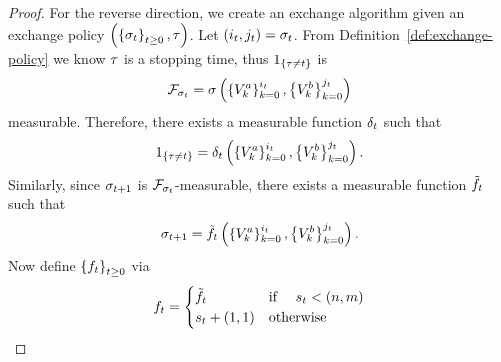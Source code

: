 \begin{proof}
    For the reverse direction, we create an exchange algorithm given an
    exchange policy 
    \(
        \left(
            \left\{
                \sigma_{t}
            \right\}_{t\geq 0},
            \tau 
        \right)
    \).
    Let 
    \(
        \left(
            i_{t},
            j_{t}
        \right)
        =
        \sigma_{t}
    \).
    From Definition~\ref{def:exchange-policy} we know $\tau$ is a stopping time,
    thus
    \(
        1_{
            \left\{
                \tau\neq t
            \right\}
        }
    \)
    is
    \[
        \mathcal{F}_{\sigma_{t}}
        =
        \sigma\left(
            \left\{
                V^a_{k}
            \right\}_{k=0}^{i_{t}}
            ,
            \left\{
                V^b_{k}
            \right\}_{k=0}^{j_{t}}
        \right)
    \]measurable.
    Therefore,
    there exists a measurable function $\delta_{t}$ such that 
    \[
        1_{
            \left\{
                \tau\neq t
            \right\}
        }
        =
        \delta_{t}\left(
            \left\{
                V^a_{k}
            \right\}_{k=0}^{i_{t}}
            ,
            \left\{
                V^b_{k}
            \right\}_{k=0}^{j_{t}}
        \right).
    \]
    Similarly, since $\sigma_{t+1}$ is 
    \(
        \mathcal{F}_{\sigma_{t}}
    \)-measurable,
    there exists a measurable function 
    \(
        \tilde{f_{t}}
    \)
    such that
    \[
        \sigma_{t+1}
        =
        \tilde{f_{t}}
        \left(
            \left\{
                V^a_{k}
            \right\}_{k=0}^{i_{t}}
            ,
            \left\{
                V^b_{k}
            \right\}_{k=0}^{j_{t}}
        \right) .
    \]
    Now define 
    \(
        \left\{
            f_{t}
        \right\}_{t\geq 0}
    \) 
    via
    \[
        f_{t}
        =
        \begin{cases}
            \tilde{f_{t}}
            &
            \text{if }~~~
            s_{t} < 
            \left(
                n,m
            \right)
            \\
            s_{t}+(1,1)
            & 
            \text{otherwise}

\end{cases}\]
\end{proof}
